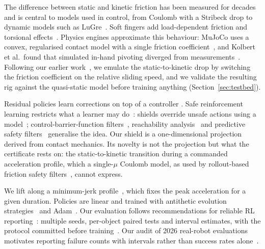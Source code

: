  The difference between static and kinetic friction has been measured for
decades~\cite{rabinowicz1951} and is central to models used in control, from Coulomb with a Stribeck drop to dynamic models
such as LuGre~\cite{armstrong1994,canudas1995,olsson1998}. Soft fingers add load-dependent friction and torsional
effects~\cite{xydas1999,howe1996}. Physics engines approximate this behaviour: MuJoCo uses a convex, regularised contact
model with a single friction coefficient~\cite{todorov2012}, and Kolbert et al.\ found that simulated in-hand pivoting
diverged from measurements~\cite{kolbert2016}. Following our earlier work~\cite{aidoo2026c}, we emulate the static-to-kinetic
drop by switching the friction coefficient on the relative sliding speed, and we validate the resulting rig against the
quasi-static model before training anything (Section~\ref{sec:testbed}).

 Residual policies learn corrections on top of a controller
\cite{johannink2019,silver2018}. Safe reinforcement learning restricts what a learner may do~\cite{garcia2015,brunke2022}:
shields override unsafe actions using a model~\cite{alshiekh2018}; control-barrier-function filters~\cite{ames2019},
reachability analysis~\cite{fisac2019} and predictive safety filters~\cite{wabersich2021} generalise the idea. Our shield
is a one-dimensional projection derived from contact mechanics. Its novelty is not the projection but what the
certificate rests on: the static-to-kinetic transition during a commanded acceleration profile, which a single-$\mu$
Coulomb model, as used by rollout-based friction safety filters~\cite{johansson2025}, cannot express.

 We lift along a minimum-jerk profile~\cite{flash1985}, which fixes the peak
acceleration for a given duration. Policies are linear and trained with antithetic evolution strategies~\cite{salimans2017,mania2018}
and Adam~\cite{kingma2015}. Our evaluation follows recommendations for reliable RL reporting~\cite{henderson2018,agarwal2021}:
multiple seeds, per-object paired tests and interval estimates, with the protocol committed before training~\cite{nosek2018}.
Our audit of 2026 real-robot evaluations motivates reporting failure counts with intervals rather than success rates
alone~\cite{aidoo2026d}.
